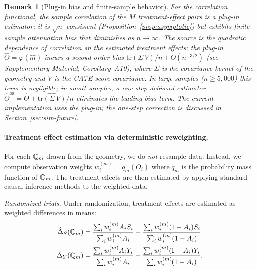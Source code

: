 \documentclass{article}
\newtheorem{remark}{Remark}
\begin{document}
\begin{remark}[Plug-in bias and finite-sample behavior]\label{rem:plugin-bias}
For the correlation functional, the sample correlation of the $M$ treatment-effect pairs is a
plug-in estimator; it is $\sqrt{n}$-consistent (Proposition~\ref{prop:asymptotic}) but exhibits
finite-sample attenuation bias that diminishes as $n \to \infty$. The source is the quadratic
dependence of correlation on the estimated treatment effects: the plug-in
$\hat\Theta = \varphi(\hat{m})$ incurs a second-order bias
$\mathrm{tr}(\Sigma\, V) / n + O(n^{-3/2})$ (see Supplementary Material,
Corollary~A10), where $\Sigma$ is the covariance kernel of the geometry and
$V$ is the CATE-score covariance. In large samples ($n \geq 5{,}000$) this term
is negligible; in small samples, a one-step debiased estimator
$\hat\Theta^{\mathrm{os}} = \hat\Theta + \widehat{\mathrm{tr}(\Sigma\, V)}/n$
eliminates the leading bias term. The current implementation uses the plug-in; the
one-step correction is discussed in Section~\ref{sec:sim-future}.
\end{remark}

\paragraph{Treatment effect estimation via deterministic reweighting.}
For each $\mathbb{Q}_m$ drawn from the geometry, we do \emph{not} resample data. Instead, we compute observation weights $w_i^{(m)} = q_m(O_i)$ where $q_m$ is the probability mass function of $\mathbb{Q}_m$. The treatment effects are then estimated by applying standard causal inference methods to the weighted data.

\textit{Randomized trials.} Under randomization, treatment effects are estimated as weighted differences in means:
\begin{align*}
    \hat{\Delta}_S(\mathbb{Q}_m) &= \frac{\sum_i w_i^{(m)} A_i S_i}{\sum_i w_i^{(m)} A_i} - \frac{\sum_i w_i^{(m)} (1-A_i) S_i}{\sum_i w_i^{(m)} (1-A_i)}\\
    \hat{\Delta}_Y(\mathbb{Q}_m) &= \frac{\sum_i w_i^{(m)} A_i Y_i}{\sum_i w_i^{(m)} A_i} - \frac{\sum_i w_i^{(m)} (1-A_i) Y_i}{\sum_i w_i^{(m)} (1-A_i)}.
\end{align*}
\end{document}
